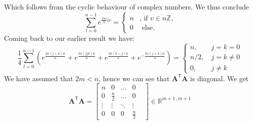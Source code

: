 \documentclass{article}
\begin{document}
Which follows from the cyclic behaviour of complex numbers. We thus conclude 
\begin{equation*}
    \sum_{l=0}^{n-1}e^{\frac{2 \pi i}{n}lv} = 
    \begin{cases}
    n &\text{, if } v \in n\mathbb{Z} \text{,} \\[1mm]
    0 &\text{ else.}
    \end{cases}
\end{equation*}
Coming back to our earlier result we have:
\begin{equation*}
     \frac{1}{4}\sum_{l=0}^{n-1}\left(e^{\frac{2 \pi\left(j+k\right)li}{n}} +e^{\frac{2 \pi\left(jjk\right)li}{n}}+ e^{\frac{2 \pi\left(k-j\right)li}{n}}+e^{-\frac{2 \pi\left(j+k\right)li}{n}}\right) = 
     \begin{cases}
     n \text{, } &j=k=0 \\
     n/2 \text{, } &j = k \neq 0 \\
     0 \text{, } &j \neq k
     \end{cases}
\end{equation*}
We have assumed that $2m < n$, hence we can see that $\mathbf{A}^{\mathsf{T}}\mathbf{A}$ is diagonal. We get 
\begin{equation*}
   \mathbf{A}^{\mathsf{T}}\mathbf{A} = \begin{bmatrix}
   n & 0& \dots & 0& \\
   0 & \frac{n}{2} & \dots & 0 \\
   \vdots & \vdots &\ddots & \vdots \\
   0 & 0 & 0 & \frac{n}{2} 
   \end{bmatrix} \in \mathbb{R}^{m+1\,\text{,}\,m+1}
\end{equation*}
\end{document}
